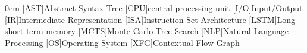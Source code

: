 \begin{acronym}[LSTM]\itemsep0em
    [AST]{Abstract Syntax Tree}
    [CPU]{central processing unit}
    [I/O]{Input/Output}
    [IR]{Intermediate Representation}
    [ISA]{Instruction Set Architecture}
    [LSTM]{Long short-term memory}
    [MCTS]{Monte Carlo Tree Search}
    [NLP]{Natural Language Processing}
    [OS]{Operating System}
    [XFG]{Contextual Flow Graph}
\end{acronym}
